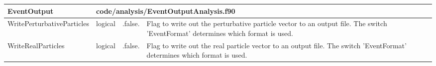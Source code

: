 \documentclass{article}
\begin{document}

\begin{longtable}{llll}
\toprule
\textbf{\large{EventOutput}} & \multicolumn{3}{l}{\footnotesize{code/analysis/EventOutputAnalysis.f90}}\\*
\midrule
\endfirsthead
\midrule
\endhead
WritePerturbativeParticles & \begin{minipage}[t]{2cm}logical\end{minipage} & \begin{minipage}[t]{2cm}.false.\end{minipage} & \begin{minipage}[t]{12cm}Flag to write out the perturbative particle vector to an output file. The switch 'EventFormat' determines which format is used.\end{minipage}\\*
\midrule
WriteRealParticles & \begin{minipage}[t]{2cm}logical\end{minipage} & \begin{minipage}[t]{2cm}.false.\end{minipage} & \begin{minipage}[t]{12cm}Flag to write out the real particle vector to an output file. The switch 'EventFormat' determines which format is used.\end{minipage}\\*
\midrule

\end{longtable}
\end{document}
